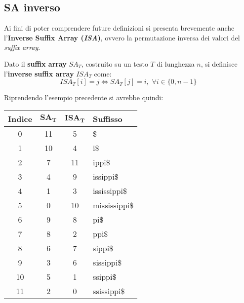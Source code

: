 \subsection{SA inverso}
Ai fini di poter comprendere future definizioni si presenta brevemente anche
l'\textbf{Inverse Suffix Array (\textit{ISA})}, ovvero la permutazione inversa
dei valori del \textit{suffix array}.
\begin{definizione}
  Dato il \textbf{suffix array} $SA_T$, costruito su un testo $T$ di lunghezza
  $n$, si definisce l'\textbf{inverse suffix array} $ISA_T$ come:
  \[ISA_T[i]=j\iff SA_T[j]=i,\,\,\forall i\in\{0,n-1\}\]
\end{definizione}
\begin{esempio}
  Riprendendo l'esempio precedente si avrebbe quindi:
  \begin{table}[H]
    \centering
    \footnotesize
    \begin{tabular}{c|c|c|l} 
      \textbf{Indice} & $\mathbf{SA_T}$ & $\mathbf{ISA_T}$ & \textbf{Suffisso}\\ 
      \hline
      0 & 11 & 5 & \$\\
      1 & 10 & 4 & i\$\\
      2 & 7 & 11 & ippi\$\\
      3 & 4 & 9 & issippi\$\\
      4 & 1 & 3 & ississippi\$\\
      5 & 0 & 10 & mississippi\$\\
      6 & 9 & 8 & pi\$\\
      7 & 8 & 2 & ppi\$\\
      8 & 6 & 7 & sippi\$\\
      9 & 3 & 6 & sissippi\$\\
      10 & 5 & 1 & ssippi\$\\
      11 & 2 & 0 & ssissippi\$\\
    \end{tabular}
  \end{table}
\end{esempio}
